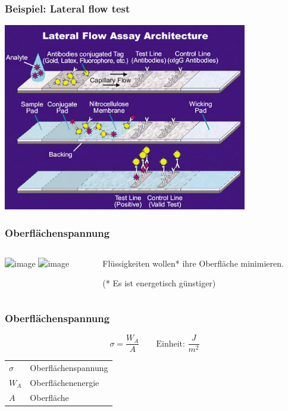 \documentclass{beamer}
\begin{document}
\begin{frame}
\frametitle{Beispiel: Lateral flow test}

\begin{center}
\includegraphics[width=0.8\textwidth]{lateral_flow_test.jpg}
\end{center}

\end{frame}



\begin{frame}
\frametitle{Oberflächenspannung}

\begin{columns}[c]

\begin{column}{5cm}
\begin{center}
\includegraphics<1>[width=\textwidth]{cohesion.png}
\includegraphics<2>[width=\textwidth]{seifenblasen.jpg}
\end{center}


\end{column}


\begin{column}{5cm}

Flüssigkeiten wollen* ihre Oberfläche minimieren. 

\pause 
\vfill

(* Es ist energetisch günstiger)



\end{column}


\end{columns}

\end{frame}


\begin{frame}
\frametitle{Oberflächenspannung}

\[
\sigma = \frac{W_A}{A} \qquad \text{Einheit: } \frac{J}{m^2}
\]

\begin{tabular}{ll}
\(\sigma\)      & Oberflächenspannung   \\
\(W_A\)         & Oberflächenenergie    \\
\(A\)           & Oberfläche           \\

\end{tabular}


\end{frame}
\end{document}
